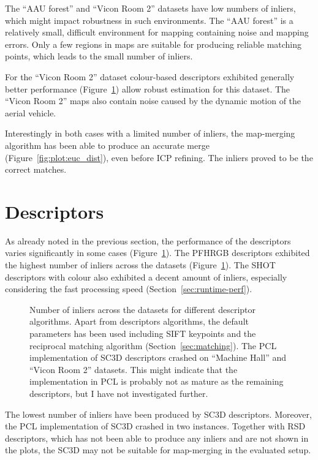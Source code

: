 The ``AAU forest'' and ``Vicon Room 2'' datasets have low numbers of inliers, which might impact robustness in such environments. The ``AAU forest'' is a relatively small, difficult environment for mapping containing noise and mapping errors. Only a few regions in maps are suitable for producing reliable matching points, which leads to the small number of inliers.

For the ``Vicon Room 2'' dataset colour-based descriptors exhibited generally better performance (Figure~\ref{fig:plot:desc_inliers}) allow robust estimation for this dataset. The ``Vicon Room 2'' maps also contain noise caused by the dynamic motion of the aerial vehicle.

Interestingly in both cases with a limited number of inliers, the map-merging algorithm has been able to produce an accurate merge (Figure~\ref{fig:plot:euc_dist}), even before \gls{ICP} refining. The inliers proved to be the correct matches.

\section{Descriptors}

As already noted in the previous section, the performance of the descriptors varies significantly in some cases (Figure~\ref{fig:plot:desc_inliers}). The \gls{PFHRGB} descriptors exhibited the highest number of inliers across the datasets (Figure~\ref{fig:plot:desc_inliers}). The \gls{SHOT} descriptors with colour also exhibited a decent amount of inliers, especially considering the fast processing speed (Section~\ref{sec:runtime-perf}).

\begin{figure}
  \centering
  
  \caption[Number of inliers per descriptors]{Number of inliers across the datasets for different descriptor algorithms. Apart from descriptors algorithms, the default parameters has been used including \gls{SIFT} keypoints and the reciprocal matching algorithm (Section~\ref{sec:matching}). The \gls{PCL} implementation of \gls{SC3D} descriptors crashed on ``Machine Hall'' and ``Vicon Room 2'' datasets. This might indicate that the implementation in \gls{PCL} is probably not as mature as the remaining descriptors, but I have not investigated further.}
  \label{fig:plot:desc_inliers}
\end{figure}

The lowest number of inliers have been produced by \gls{SC3D} descriptors. Moreover, the \gls{PCL} implementation of \gls{SC3D} crashed in two instances. Together with \gls{RSD} descriptors, which has not been able to produce any inliers and are not shown in the plots, the \gls{SC3D} may not be suitable for map-merging in the evaluated setup.

